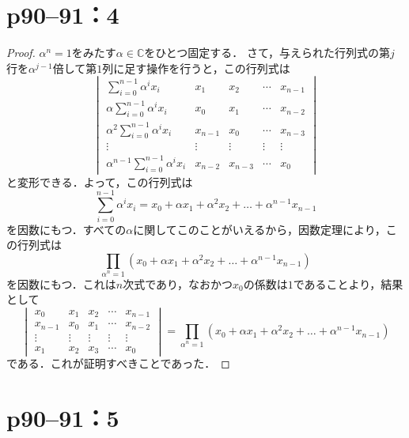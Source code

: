 \documentclass[a4paper,10pt,fleqn]{ltjsarticle}
\begin{document}
\newpage


\section*{p90--91：4}

\begin{leftbar}
  \begin{proof}
    $\alpha ^n =1$をみたす$\alpha \in \mathbb{C}$をひとつ固定する．
    さて，与えられた行列式の第$j$行を$\alpha^{j-1}$倍して第$1$列に足す操作を行うと，この行列式は
    \[
      \begin{vmatrix}
        \sum_{i=0}^{n-1} \alpha^i x_i              & x_1     & x_2     & \cdots & x_{n-1} \\
        \alpha \sum_{i=0}^{n-1} \alpha^i x_i       & x_0     & x_1     & \cdots & x_{n-2} \\
        \alpha^2 \sum_{i=0}^{n-1} \alpha^i x_i     & x_{n-1} & x_0     & \cdots & x_{n-3} \\
        \vdots                                     & \vdots  & \vdots  & \vdots & \vdots  \\
        \alpha^{n-1} \sum_{i=0}^{n-1} \alpha^i x_i & x_{n-2} & x_{n-3} & \cdots & x_0
      \end{vmatrix}
    \]
    と変形できる．よって，この行列式は
    \[
      \sum_{i=0}^{n-1} \alpha^i x_i = x_0 + \alpha x_1 + \alpha^2 x_2 + \dots +\alpha^{n-1} x_{n-1}
    \]
    を因数にもつ．すべての$\alpha$に関してこのことがいえるから，因数定理により，この行列式は
    \[
      \prod_{\alpha^n=1} (x_0 + \alpha x_1 + \alpha^2 x_2 + \dots +\alpha^{n-1} x_{n-1})
    \]
    を因数にもつ．これは$n$次式であり，なおかつ$x_0$の係数は$1$であることより，結果として
    \[
      \begin{vmatrix}
        x_0     & x_1    & x_2    & \cdots & x_{n-1} \\
        x_{n-1} & x_0    & x_1    & \cdots & x_{n-2} \\
        \vdots  & \vdots & \vdots & \vdots & \vdots  \\
        x_1     & x_2    & x_3    & \cdots & x_0
      \end{vmatrix}
      =  \prod_{\alpha^n=1} (x_0 + \alpha x_1 + \alpha^2 x_2 + \dots +\alpha^{n-1} x_{n-1})
    \]
    である．これが証明すべきことであった．
  \end{proof}
\end{leftbar}


\section*{p90--91：5}
\end{document}
